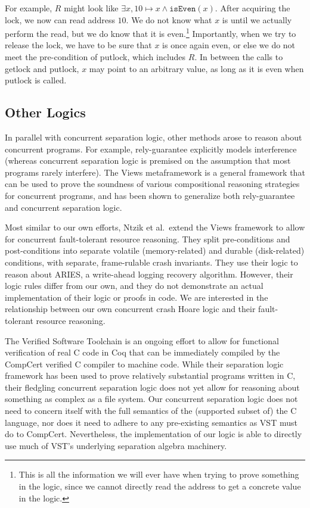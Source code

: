 For example, $R$ might look like $\exists x, 10\mapsto x \wedge
\texttt{isEven}(x)$.  After acquiring the lock, we now can read address $10$.
We do not know what $x$ is until we actually perform the read, but we do know
that it is even.\footnote{This is all the information we will ever have when
trying to prove something in the logic, since we cannot directly read the
address to get a concrete value in the logic.} Importantly, when we try to
release the lock, we have to be sure that $x$ is once again even, or else we do
not meet the pre-condition of putlock, which includes $R$. In between the calls
to getlock and putlock, $x$ may point to an arbitrary value, as long as it is
even when putlock is called.

\subsection{Other Logics}

In parallel with concurrent separation logic, other methods arose to
reason about concurrent programs. For example,
rely-guarantee\cite{jones1981development} explicitly models interference
(whereas concurrent separation logic is premised on the assumption that most
programs rarely interfere). The Views metaframework\cite{dinsdale2013views} is a
general framework that can be used to prove the soundness of various
compositional reasoning strategies for concurrent programs, and has been shown
to generalize both rely-guarantee and concurrent separation logic.

Most similar to our own efforts, Ntzik et al.\ extend the Views framework to
allow for concurrent fault-tolerant resource reasoning\cite{ntzik2015fault}.
They split pre-conditions and post-conditions into separate volatile
(memory-related) and durable (disk-related) conditions, with separate,
frame-rulable crash invariants. They use their logic to reason about
ARIES\cite{ntzik2015fault}, a write-ahead logging recovery algorithm. However,
their logic rules differ from our own, and they do not demonstrate an actual
implementation of their logic or proofs in code. We are interested in the
relationship between our own concurrent crash Hoare logic and their
fault-tolerant resource reasoning.

The Verified Software Toolchain\cite{appel2014program} is an ongoing effort to
allow for functional verification of real C code in Coq that can be immediately
compiled by the CompCert\cite{leroy2009formal} verified C compiler to machine
code. While their separation logic framework has been used to prove relatively
substantial programs written in C, their fledgling concurrent separation logic
does not yet allow for reasoning about something as complex as a file system.
Our concurrent separation logic does not need to concern itself with the full
semantics of the (supported subset of) the C language, nor does it need to
adhere to any pre-existing semantics as VST must do to CompCert. Nevertheless,
the implementation of our logic is able to directly use much of VST's underlying
separation algebra machinery.

